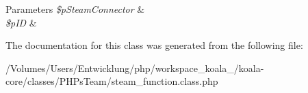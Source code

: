 \begin{DoxyParams}{Parameters}
{\em \$pSteamConnector} & \\
\hline
{\em \$pID} & \\
\hline
\end{DoxyParams}


The documentation for this class was generated from the following file:\begin{DoxyCompactItemize}
\item 
/Volumes/Users/Entwicklung/php/workspace\_\-koala\_/koala-\/core/classes/PHPsTeam/steam\_\-function.class.php\end{DoxyCompactItemize}
